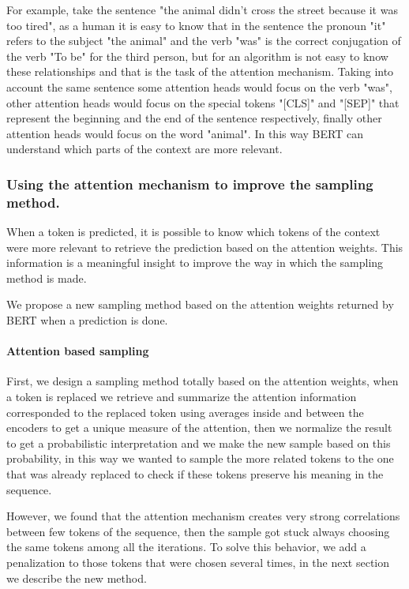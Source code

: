 \documentclass[10pt,twocolumn,letterpaper]{article}
\begin{document}
For example, take the sentence "the animal didn't cross the street because it was too tired",
as a human it is easy to know that in the sentence the pronoun "it" refers to the subject "the animal"
and the verb "was" is the correct conjugation of the verb "To be" for the third person, but for an
algorithm is not easy to know these relationships and that is the task of the attention mechanism.
Taking into account the same sentence
some attention heads would focus on the verb "was", other attention heads would focus
on the special tokens "[CLS]" and "[SEP]" that represent the beginning and the end of the sentence
respectively, finally other attention heads would focus on the word "animal". In this way BERT can
understand which parts of the context are more relevant.

\subsubsection{Using the attention mechanism to improve the sampling method.}
When a token is predicted, it is possible to know which tokens of the context were more relevant to
retrieve the prediction based on the attention weights.
This information is a meaningful insight to improve
the way in which the sampling method is made.

We propose a new sampling method based on the attention
weights returned by BERT when a prediction is done.

\paragraph{Attention based sampling}
First, we design a sampling method totally based on the attention weights, when a token is replaced we retrieve
and summarize the attention information corresponded to the replaced token using averages inside and between the
encoders to get a unique measure of the attention, then we normalize the result to get a probabilistic interpretation
and we make the new sample based on this probability, in this way we wanted to sample the more related tokens to the one
that was already replaced to check if these tokens preserve his meaning in the sequence.

However, we found that the attention mechanism creates very strong correlations between
few tokens of the sequence, then the sample got stuck always choosing the same tokens among
all the iterations.
To solve this behavior, we add a penalization to those tokens that were
chosen several times, in the next section we describe the new method.
\end{document}
